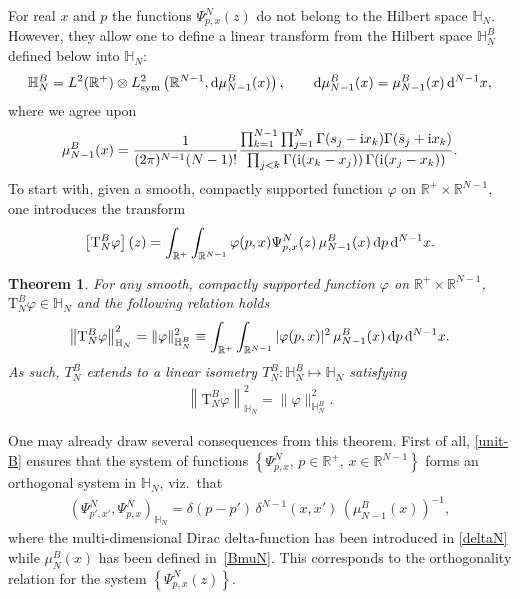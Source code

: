 \documentclass[pdftex]{sigma}%
\numberwithin{equation}{section}
\newtheorem{Theorem}{Theorem}[section]
\begin{document}
For real $x$ and $p$ the functions $\Psi^N_{p, x}({z})$ do not belong to the Hilbert space $\mathbb H_N$. However, they allow one to
define a linear transform from the Hilbert space $\mathbb H_N^B$ defined below into $\mathbb H_N$:
\begin{gather*}
\mathbb H_N^B =L^2(\mathbb R^+)\otimes L^2_{\rm sym}\left(\mathbb R^{N-1},{\rm d}\mu^B_{N-1}(x)\right), \qquad
{\rm d}\mu^B_{N-1}(x)=\mu^B_{N-1}(x)\, {\rm d}^{N-1}x,
\end{gather*}
where we agree upon
\begin{gather}\label{BmuN}
\mu_{N-1}^{B}(x)=\frac1{(2\pi)^{N-1} (N-1)!}
\frac{\prod_{k=1}^{N-1}\prod_{j=1}^N\Gamma(s_j-{\rm i}x_k)\Gamma(\bar s_j+{\rm i}x_k)}
{\prod_{j< k}\Gamma({\rm i}(x_k-x_j))\,\Gamma({\rm i}(x_j-x_k))}.
\end{gather}
To start with, given a smooth, compactly supported function $\varphi$ on $\mathbb{R}^+\times\mathbb{R}^{N-1}$, one introduces the transform
\begin{gather}\label{Bclosed-map}
\left[ \mathrm T_{N}^{B}\varphi\right]( z)
=\int_{\mathbb R^+} \int_{\mathbb R^{N-1}} \varphi(p, x)
 \Psi^N_{p,{x}}({z})\, \mu_{N-1}^{B}( x)\, {\rm d}p\, {\rm d}^{N-1} x.
\end{gather}


\begin{Theorem}
For any smooth, compactly supported function $\varphi$ on $\mathbb{R}^+\times\mathbb{R}^{N-1}$,
 $ \mathrm T_{N}^{B}\varphi \in \mathbb{H}_N$ and the following relation holds
\begin{gather}\label{unit-B}
\left\|\mathrm T_{N}^{B}\varphi\right\|_{\mathbb H_N}^2=\|{\varphi}\|_{\mathbb H_N^{B}}^2
\equiv \int_{\mathbb R^+} \int_{\mathbb R^{N-1}} |\varphi(p, x)|^2\,
 \mu_{N-1}^{B}( x) \,{\rm d}p\, {\rm d}^{N-1} x.
\end{gather}
As such, $T_{N}^{B}$ extends to a linear isometry $T_{N}^{B}\colon \mathbb H_N^B \mapsto \mathbb H_N$ satisfying
\begin{gather*}
\left\|\mathrm T_{N}^{B}\varphi\right\|_{\mathbb H_N}^2=\|{\varphi}\|_{\mathbb H_N^{B}}^2 .
\end{gather*}
\end{Theorem}

One may already draw several consequences from this theorem. First of all, \eqref{unit-B} ensures that the system of functions
$\left\{\Psi^{N}_{p,{x}},\, p\in \mathbb R^+, \,x \in \mathbb R^{N-1}\right\}$ forms an orthogonal system in $\mathbb H_N$, viz.~that
\begin{gather*}%
\left(\Psi^N_{p', x'}, \Psi^N_{p,{x}}\right)_{\mathbb{H}_N}= \delta(p-p')\,
\delta^{N-1}( x , x') \, \left(\mu_{N-1}^{B}( x)\right)^{-1}\!,
\end{gather*}
where the multi-dimensional Dirac delta-function has been introduced in \eqref{deltaN} while $\mu_N^{B}( x)$ has been defined in~\eqref{BmuN}. This corresponds to the orthogonality relation for the system $\left\{\Psi^N_{p,{x}}(z)\right\}$.
\end{document}
